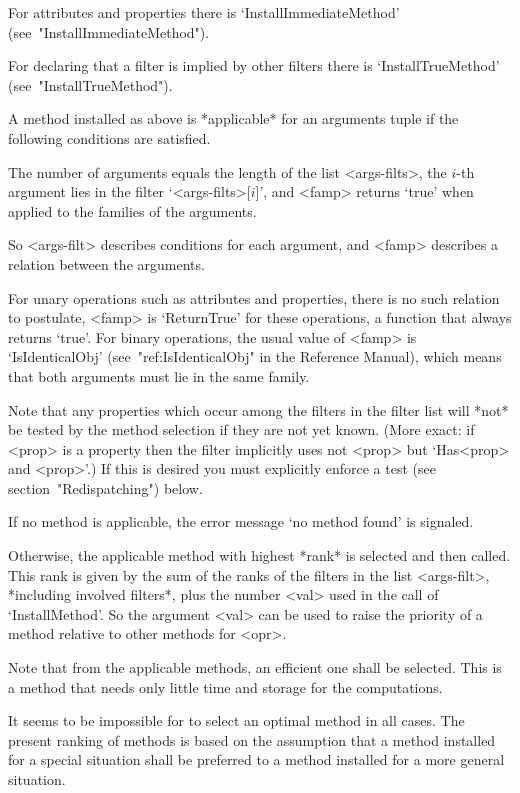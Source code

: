 For attributes and properties there is `InstallImmediateMethod' 
(see~"InstallImmediateMethod").

For declaring that a filter is implied by other filters there is
`InstallTrueMethod' (see~"InstallTrueMethod").


A method installed as above is *applicable* for an arguments tuple
if the following conditions are satisfied.

The number of arguments equals the length of the list <args-filts>,
the $i$-th argument lies in the filter `<args-filts>[$i$]',
and <famp> returns `true' when applied to the families of the arguments.

So <args-filt> describes conditions for each argument,
and <famp> describes a relation between the arguments.

For unary operations such as attributes and properties,
there is no such relation to postulate,
<famp> is `ReturnTrue' for these operations,
a function that always returns `true'.
For binary operations, the usual value of <famp> is `IsIdenticalObj'
(see~"ref:IsIdenticalObj" in the Reference Manual),
which means that both arguments must lie in the same family.

Note that any properties which occur among the filters in the filter list
will *not* be tested by the method selection if they are not yet known.
(More exact: if <prop> is a property then the filter implicitly uses not
<prop> but `Has<prop> and <prop>'.) If this is desired you must explicitly
enforce a test (see section~"Redispatching") below.

If no method is applicable,
the error message `no method found' is signaled.

Otherwise, the applicable method with highest *rank* is selected and then
called.
This rank is given by the sum of the ranks of the filters in the list
<args-filt>,
*including involved filters*,
plus the number <val> used in the call of `InstallMethod'.
So the argument <val> can be used to raise the priority of a method
relative to other methods for <opr>.

Note that from the applicable methods,
an efficient one shall be selected.
This is a method that needs only little time and storage for the
computations.

It seems to be impossible for {\GAP} to select an optimal
method in all cases.
The present ranking of methods is based on the assumption
that a method installed for a special situation shall be preferred
to a method installed for a more general situation.

